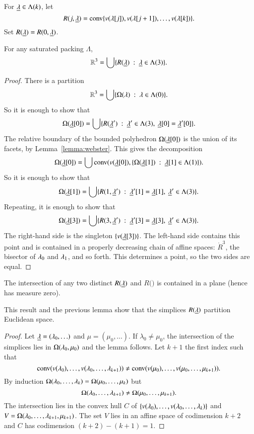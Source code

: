 For ${\underline{\lambda}}\in\Lambda(k)$, let 
$$R(j,{\underline{\lambda}}) = {\operatorname{conv}}\{v(\lambda[j]), v(\lambda[j+1]),\ldots,v(\lambda[k])\}.$$  Set $R({\underline{\lambda}})=R(0,{\underline{\lambda}})$.


\begin{lemma}
For any saturated packing $\Lambda$, 
$$\mathbb{R}^3 = \bigcup \{ R({\underline{\lambda}}) \ :\  {\underline{\lambda}}\in \Lambda(3)\}.$$
\end{lemma}

\begin{proof}
There is a partition $$\mathbb{R}^3 = \bigcup \{\Omega(\lambda)\ :\  \lambda\in \Lambda(0)\}.$$
So it is enough to show that
$$\Omega({\underline{\lambda}}[0]) = \bigcup \{ R({\underline{\lambda}}') \ :\  {\underline{\lambda}}'\in \Lambda(3),~{\underline{\lambda}}[0]={\underline{\lambda}}'[0]\}.$$
The relative boundary of the bounded polyhedron $\Omega({\underline{\lambda}}[0])$ is the union of its facets, by Lemma~\ref{lemma:webster}.  This gives the decomposition
$$\Omega({\underline{\lambda}}[0]) = \bigcup {\operatorname{conv}}(v({\underline{\lambda}}[0]),\{\Omega({\underline{\lambda}}[1])\ :\  {\underline{\lambda}}[1]\in \Lambda(1)\}).$$
So it is enough to show that
$$\Omega({\underline{\lambda}}[1]) = \bigcup \{ R(1,{\underline{\lambda}}') \ :\  {\underline{\lambda}}'[1]={\underline{\lambda}}[1],~{\underline{\lambda}}'\in \Lambda(3)\}.$$
Repeating, it is enough to show that
$$\Omega({\underline{\lambda}}[3]) = \bigcup\{R(3,{\underline{\lambda}}')\ :\ {\underline{\lambda}}'[3]={\underline{\lambda}}[3],~{\underline{\lambda}}'\in\Lambda(3)\}.$$
The right-hand side is the singleton $\{v({\underline{\lambda}}[3])\}$.  The left-hand side
contains this point and is contained in a properly decreasing chain of affine spaces:
$\ring{R}^3$, the bisector of $\lambda_0$ and $\lambda_1$, and so forth.  This determines a point,
so the two sides are equal.
\end{proof}

\begin{lemma}  
The intersection of any two distinct $R({\underline{\lambda}})$ and $R(\bm)$ is contained in a plane (hence has measure zero).
\end{lemma}

This result and the previous lemma show that the simplices $R({\underline{\lambda}})$ partition Euclidean
space.

\begin{proof}  Let ${\underline{\lambda}} = (\lambda_0,\ldots)$ and $\mu = (\mu_0,\ldots)$.
If $\lambda_0\ne\mu_0$, the intersection of the simplices lies in $\Omega(\lambda_0,\mu_0)$
and the lemma follows.  Let $k+1$ the first index such that
$${\operatorname{conv}}(v(\lambda_0),\ldots,v(\lambda_0,\ldots,\lambda_{k+1}))\ne
{\operatorname{conv}}(v(\mu_0),\ldots,v(\mu_0,\ldots,\mu_{k+1})).
$$
By induction $\Omega(\lambda_0,\ldots,\lambda_k) = \Omega(\mu_0,\ldots,\mu_k)$
but
$$\Omega(\lambda_0,\ldots,\lambda_{k+1}) \ne \Omega(\mu_0,\ldots,\mu_{k+1}).$$
The intersection lies in the convex hull $C$ of
$\{v(\lambda_0),\ldots,v(\lambda_0,\ldots,\lambda_k)\}$ and
$V=\Omega(\lambda_0,\ldots,\lambda_{k+1},\mu_{k+1})$.  The set $V$ lies in an affine space of 
codimension $k+2$
and $C$ has codimension $(k+2) - (k+1) = 1$.
\end{proof}

